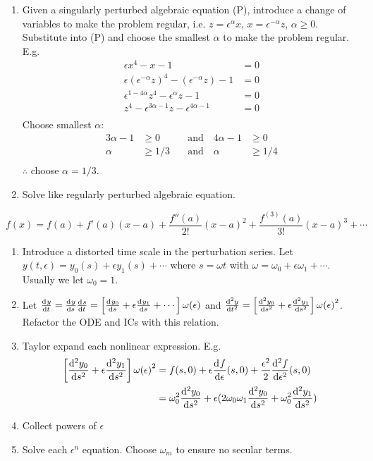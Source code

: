 \item[Singularly Perturbed Algebraic Solutions] \hfill
  \begin{enumerate}
  \item Given a singularly perturbed algebraic equation (P), introduce a change
    of variables to make the problem regular, i.e. $z=\epsilon^\alpha x$,
    $x=\epsilon^{-\alpha}z$, $\alpha\ge0$. Substitute into (P) and choose the
    smallest $\alpha$ to make the problem regular. E.g.
    \begin{align*}
      \epsilon x^4-x-1&=0 \\
      \epsilon{(\epsilon^{-\alpha}z)}^4-(\epsilon^{-\alpha}z)-1&=0 \\
      \epsilon^{1-4\alpha}z^4-\epsilon^{\alpha}z-1&=0 \\
      z^4-\epsilon^{3\alpha-1}z-\epsilon^{4\alpha-1}&=0 \\
    \end{align*}
    Choose smallest $\alpha$:
    \begin{align*}
      3\alpha-1&\ge0 \quad&\text{and}\quad 4\alpha-1&\ge0 \\
      \alpha&\ge1/3 \quad&\text{and}\quad \alpha&\ge1/4 \\
    \end{align*}
    $\therefore$ choose $\alpha=1/3$.
  \item Solve like regularly perturbed algebraic equation.
  \end{enumerate}

\item[Taylor Series]
  $$f(x)=f(a)+f'(a)(x-a)+\frac{f''(a)}{2!}{(x-a)}^2+\frac{f^{(3)}(a)}{3!}{(x-a)}^3+\cdots$$

\item[Poincar\'e-Lindstedt Method] \hfill
  \begin{enumerate}
  \item Introduce a distorted time scale in the perturbation series. Let
    $y(t,\epsilon)=y_0(s) + \epsilon y_1(s) + \cdots$ where $s=\omega t$ with
    $\omega = \omega_0 + \epsilon\omega_1 + \cdots$. Usually we let
    $\omega_0=1$.
  \item Let $\od{y}{t}=\od{y}{s}\od{s}{t}=\left[\od{y_0}{s} +
      \epsilon\od{y_1}{s} + \cdots\right] \omega(\epsilon)$ and
    $\od[2]{y}{t}=\left[\od[2]{y_0}{s} +
      \epsilon\od[2]{y_1}{s}\right]{\omega(\epsilon)}^2$. Refactor the ODE and
    ICs with this relation.
  \item Taylor expand each nonlinear expression. E.g.
    \begin{align*}
      \left[ \od[2]{y_0}{s}+\epsilon\od[2]{y_1}{s} \right]{\omega(\epsilon)}^2
      &= f(s,0)+\epsilon\od{f}{\epsilon}(s,0) +
        \frac{\epsilon^2}{2}\od[2]{f}{\epsilon}(s,0) \\
      &= \omega_0^2 \od[2]{y_0}{s} + \epsilon(2\omega_0\omega_1\od[2]{y_0}{s} +
        \omega_0^2\od[2]{y_1}{s}) \
    \end{align*}
  \item Collect powers of $\epsilon$
  \item Solve each $\epsilon^n$ equation. Choose $\omega_m$ to ensure no secular
    terms.
  \end{enumerate}
